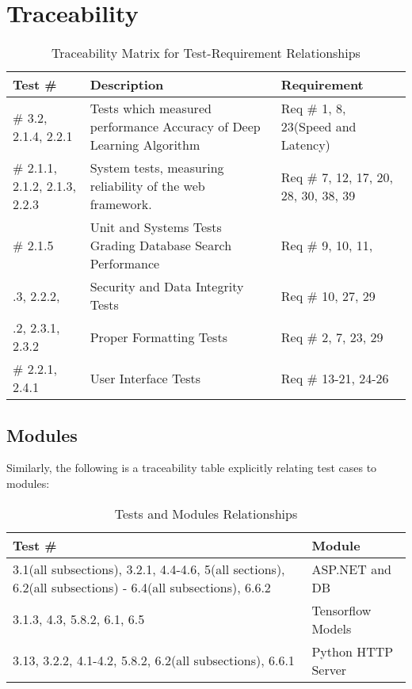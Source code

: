 \documentclass{scrreprt}
\begin{document}
\chapter{Traceability} %
\begin{center}
\begin{longtable}{>{\raggedright\arraybackslash}p{}>{\raggedright\arraybackslash}p{}>{\raggedright\arraybackslash}p{}}
\caption{Traceability Matrix for Test-Requirement Relationships}\label{Table_TestsAndRequirements}
\\\toprule
\textbf Test \#  & \textbf Description & \textbf Requirement\\\midrule
\# 3.2,  2.1.4,  2.2.1
& Tests which measured performance Accuracy of Deep Learning Algorithm
&  Req \# 1, 8,  23(Speed and Latency)\\
\# 2.1.1,  2.1.2, 2.1.3, 2.2.3 & System tests, measuring reliability of the web framework. &
Req \# 7,  12,  17, 20,  28,  30, 38, 39
\\
\# 2.1.5
 & Unit and Systems Tests Grading Database Search Performance & Req \# 9, 10, 11,
 \\
2.1.3, 2.2.2,  & Security and Data Integrity Tests & Req \# 10, 27, 29 \\
2.2.2, 2.3.1, 2.3.2 & Proper Formatting Tests & Req \# 2, 7, 23, 29
\\
\# 2.2.1, 2.4.1 & User Interface Tests & Req \# 13-21, 24-26
\\
\bottomrule
\end{longtable}
\end{center}
\section{Modules}
Similarly, the following is a traceability table explicitly relating test cases to modules:\\
\begin{table}
\caption{Tests and Modules Relationships}
\begin{center}
\begin{tabular}{p{6cm} p{4cm}}
\hline
\textbf Test \#  & Module \\
\hline
3.1(all subsections), 3.2.1, 4.4-4.6, 5(all sections), 6.2(all subsections) - 6.4(all subsections), 6.6.2 & ASP.NET and DB \\
\hline
3.1.3, 4.3, 5.8.2, 6.1, 6.5 & Tensorflow Models \\
\hline
3.13, 3.2.2, 4.1-4.2, 5.8.2, 6.2(all subsections), 6.6.1 & Python HTTP Server\\
\hline
\end{tabular}
\end{center}
\end{table}
\end{document}
